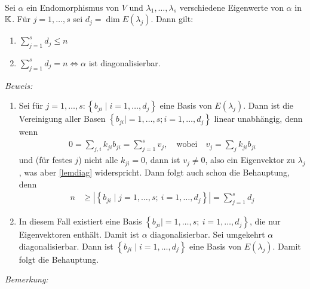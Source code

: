 \begin{mysatz}\ \medskip

    Sei $\alpha$ ein Endomorphismus von $V$ und $\lambda_1,\ldots,\lambda_s$ verschiedene Eigenwerte von $\alpha$ in $\mathbb{K}$. Für $j=1,\ldots,s$ sei $d_j=\dim E(\lambda_j)$. Dann gilt:
    \begin{enumerate}
        \item $\sum\limits_{j=1}^s d_j \leq n$
        \item $\sum\limits_{j=1}^s d_j = n \Leftrightarrow \alpha$ ist diagonalisierbar.
    \end{enumerate}

    \textit{Beweis:}
    \begin{enumerate}
        \item Sei für $j=1,\ldots,s: \left\{ b_{ji} \mid i=1,\ldots,d_j \right\}$ eine Basis von $E(\lambda_j)$. Dann ist die Vereinigung aller Basen $\left\{ b_{ji}|=1,\ldots,s; i=1,\ldots,d_j \right\}$ linear unabhängig, denn wenn
            \begin{align*}
                0 = \sum_{j,i} k_{ji}b_{ji} = \sum_{j=1}^s v_j, \quad \mbox{wobei} \quad v_j = \sum_j k_{ji} b_{ji}
            \end{align*}
            und (für festes $j$) nicht alle $k_{ji}=0$, dann ist $v_j \neq 0$, also ein Eigenvektor zu $\lambda_j$, was aber \ref{lemdiag} widerspricht. Dann folgt auch schon die Behauptung, denn
            \begin{align*}
                n & \geq \left|\left\{ b_{ji} \mid j = 1,\ldots,s;\ i=1,\ldots,d_j \right\} \right| = \sum_{j=1}^s d_j
            \end{align*}
        \item In diesem Fall existiert eine Basis $\left\{ b_{ji} \mid =1,\ldots,s;\ i=1,\ldots,d_j \right\}$, die nur Eigenvektoren enthält. Damit ist $\alpha$ diagonalisierbar. Sei umgekehrt $\alpha$ diagonalisierbar. Dann ist $\left\{ b_{ji} \mid i=1,\ldots,d_j \right\}$ eine Basis von $E(\lambda_j)$. Damit folgt die Behauptung.
    \end{enumerate}
\end{mysatz}

\textit{Bemerkung:}\medskip

